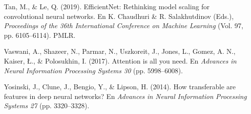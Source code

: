\documentclass[11pt,letterpaper]{article}
\begin{document}
Tan, M., \& Le, Q. (2019). EfficientNet: Rethinking model scaling for convolutional neural networks. En K. Chaudhuri \& R. Salakhutdinov (Eds.), \emph{Proceedings of the 36th International Conference on Machine Learning} (Vol. 97, pp. 6105--6114). PMLR.

Vaswani, A., Shazeer, N., Parmar, N., Uszkoreit, J., Jones, L., Gomez, A. N., Kaiser, Ł., \& Polosukhin, I. (2017). Attention is all you need. En \emph{Advances in Neural Information Processing Systems 30} (pp. 5998--6008).

Yosinski, J., Clune, J., Bengio, Y., \& Lipson, H. (2014). How transferable are features in deep neural networks? En \emph{Advances in Neural Information Processing Systems 27} (pp. 3320--3328).

\endgroup
\end{document}
